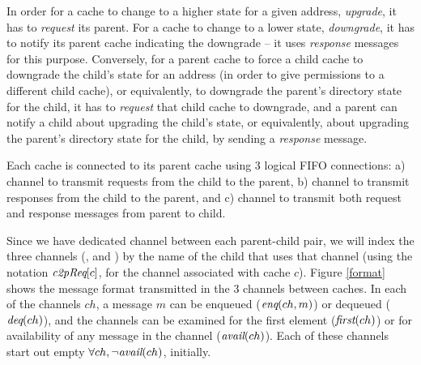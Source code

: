In order for a cache to change to a higher state for a given address,
\ie{} \emph{upgrade}, it has to \emph{request} its parent.  For a
cache to change to a lower state, \ie \emph{downgrade}, it has to
notify its parent cache indicating the downgrade -- it uses
\emph{response} messages for this purpose. Conversely, for a parent
cache to force a child cache to downgrade the child's state for an
address (in order to give permissions to a different child cache), or
equivalently, to downgrade the parent's directory state for the child,
it has to \emph{request} that child cache to downgrade, and a parent
can notify a child about upgrading the child's state, or equivalently,
about upgrading the parent's directory state for the child, by sending
a \emph{response} message.

Each cache is connected to its parent cache using 3 logical FIFO
connections: a) \cpReq{} channel to transmit requests from the child
to the parent, b) \cpResp{} channel to transmit responses from the
child to the parent, and c) \pc{} channel to transmit both request and
response messages from parent to child. 

Since we have dedicated channel between each parent-child pair, we
will index the three channels (\cpReq{}, \cpResp{} and \pc{}) by the
name of the child that uses that channel (using the notation
$\textit{c2pReq}[c]$, \etc for the \cpReq{} channel associated with cache $c$).
Figure \ref{format} shows the message format transmitted in the 3
channels between caches. In each of the channels $ch$, a message $m$
can be enqueued ($\textit{enq}(ch, m)$) or dequeued ($\textit{deq}(ch)$), and the
channels can be examined for the first element ($\textit{first}(ch)$) or for
availability of any message in the channel ($\textit{avail}(ch)$).  Each of
these channels start out empty \ie $\forall ch, \neg \textit{avail}(ch)$,
initially.


